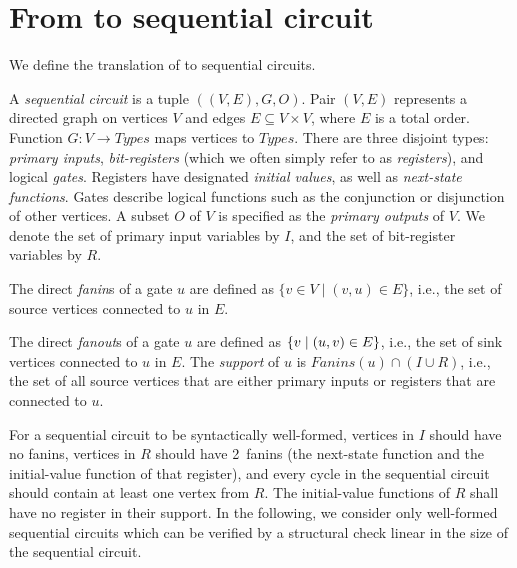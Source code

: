\section{From \caig to sequential circuit}
\label{sec:sequential}
%
We define the translation of \caig to sequential circuits.
%
\begin{definition}
A {\em sequential circuit} is a tuple $\left( (V, E),G,
O\right)$.
Pair $(V,E)$ represents a directed graph on
vertices $V$ and edges $E \subseteq V\times V$, where $E$
is a total order.  Function $G: V \to
\mathit{Types}$ maps vertices to $\mathit{Types}$.
There are three disjoint types: {\em primary inputs}, {\em
bit-registers} (which we often simply refer to as {\em
registers}), and logical {\em gates}.  Registers have designated
{\em initial values}, as well as {\em next-state
functions}.  Gates describe logical functions such as
the conjunction or disjunction of other vertices. 
A subset $O$ of $V$ is specified as the {\em
primary outputs} of $V$.  
We denote the set of primary input variables by $I$,
and the set of bit-register variables by $R$.  
\label{def:back:seq_circuit}
\end{definition}
%
\begin{definition}
The direct \emph{fanin}s of a gate $u$ 
are defined as
$\{v \in V \mid (v,u)\in E\}$, i.e., the set of source vertices connected
to $u$ in $E$.  

The direct {\em fanout}s of a gate $u$ are defined as 
$\{ v \mid (u,v) \in E \}$, i.e., 
  the set of sink vertices connected
to $u$ in $E$.
The {\em support} of $u$ 
is $\mathit{Fanins}(u) \cap (I \cup R)$, i.e., the set of all source vertices that are either primary inputs or registers that are connected to $u$.
\label{def:back:fanins} 
\end{definition}
%
%
For a sequential
circuit to be syntactically well-formed, vertices in $I$
should have no fanins, vertices in $R$ should have
2~fanins (the next-state function and the initial-value
function of that register), %
and every cycle in the sequential circuit should contain
at least one vertex from $R$.  The initial-value functions
of $R$ shall have no register in their support.  
In the following, 
we consider only well-formed sequential circuits which can be 
verified by a structural check linear in the size of the 
sequential circuit.
%

